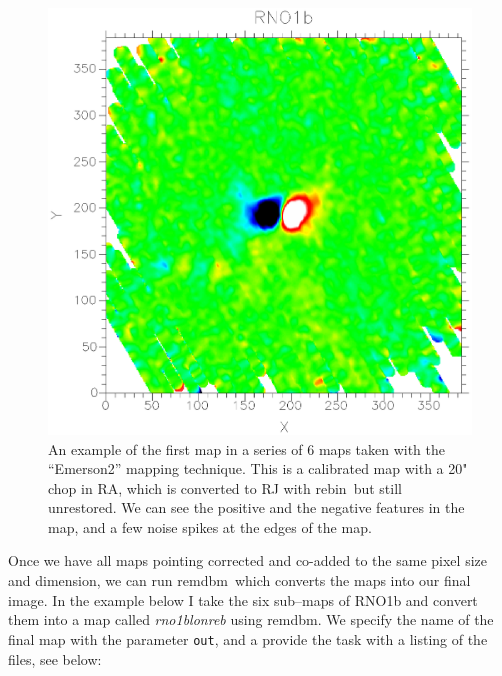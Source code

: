 \documentclass[twoside,11pt]{article}
\newcommand{\task}[1]{\textsf{#1}}
\newcommand{\rebin}{\xref{\task{rebin}}{sun216}{REBIN}}
\newcommand{\remdbm}{\xref{\task{remdbm}}{sun216}{REMDBM}}
\newcommand{\xref}[3]{#1}
\renewcommand{\_}{\texttt{\symbol{95}}}
\begin{document}
\begin{figure}
\begin{center}
\includegraphics[width=\textwidth]{sc11_fig9.eps}
\caption{An example of the first map in a series of 6 maps taken 
with the ``Emerson2'' mapping technique. This is a calibrated map 
with a 20" chop in RA, which is converted to RJ with \rebin\, but 
still unrestored. We can see the positive and the negative features 
in the map, and a few noise spikes at the edges of the map. }
\label{fig:dual}
\end{center}
\end{figure}


Once we have all maps pointing corrected and co-added to the same
pixel size and dimension, we can run \remdbm\, which converts the maps
into our final image.  In the example below I take the six sub--maps
of RNO1b and convert them into a map called {\it rno1b\_lon\_reb}
using \remdbm.  We specify the name of the final map with the parameter
\texttt{out}, and a provide the task with a listing of the files, see
below:
\end{document}
